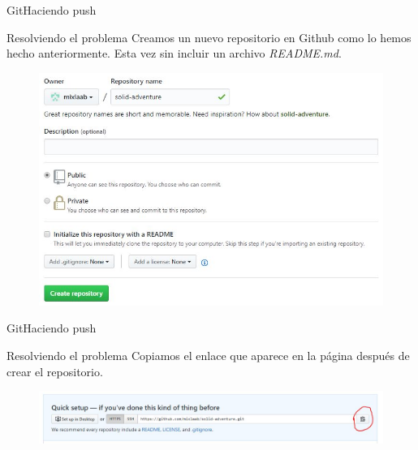 \documentclass[10pt]{beamer}
\begin{document}
\begin{frame}{Git}{Haciendo push}

\begin{block}{Resolviendo el problema}
Creamos un nuevo repositorio en Github como lo hemos hecho anteriormente. Esta vez sin incluir un archivo \textit{README.md}.
\begin{figure}[h!]
\centering
\includegraphics [scale=0.45]{step5}
\label{fig:gitstatus}
\end{figure}

\end{block}

\end{frame}

\begin{frame}{Git}{Haciendo push}

\begin{block}{Resolviendo el problema}
Copiamos el enlace que aparece en la página después de crear el repositorio.
\begin{figure}[h!]
\centering
\includegraphics [scale=0.36]{step6}
\label{fig:gitstatus}
\end{figure}

\end{block}

\end{frame}
\end{document}
